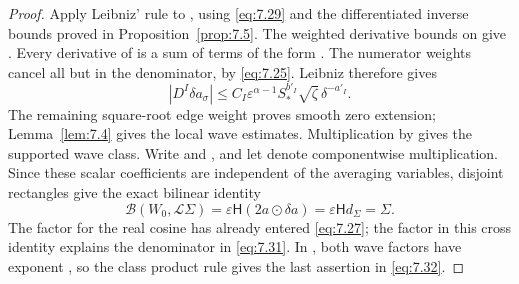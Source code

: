 \begin{proof}
Apply Leibniz' rule to
, using
\eqref{eq:7.29} and the differentiated inverse bounds proved in
Proposition~\ref{prop:7.5}. The weighted derivative bounds on
 give
. Every derivative
of  is a sum of terms of the form
. The  numerator
weights cancel all but  in the denominator,
by \eqref{eq:7.25}. Leibniz therefore gives
\begin{equation}
  |D^I\delta a_\sigma|
  \leq C_I\varepsilon^{\alpha-1}S_*^{b'_I}\sqrt{\zeta}\,\delta^{-a'_I}.
  \tag{7.33}\label{eq:7.33}
\end{equation}
The remaining square-root edge weight proves smooth zero extension;
Lemma~\ref{lem:7.4} gives the local wave estimates. Multiplication by
 gives the supported wave class. Write
 and
, and let
 denote componentwise multiplication. Since these
scalar coefficients are independent of the averaging variables, disjoint
rectangles give the exact bilinear identity
\begin{equation}
  \mathcal B(W_0,\mathcal L\Sigma)
  =\varepsilon\mathsf H(2a\odot\delta a)=\varepsilon\mathsf Hd_\Sigma=\Sigma.
  \tag{7.34}\label{eq:7.34}
\end{equation}
The factor  for the real cosine has already entered
\eqref{eq:7.27}; the factor  in this cross identity
explains the denominator in \eqref{eq:7.31}. In
, both wave factors
have exponent , so the class product rule gives
the last assertion in \eqref{eq:7.32}.
\end{proof}
